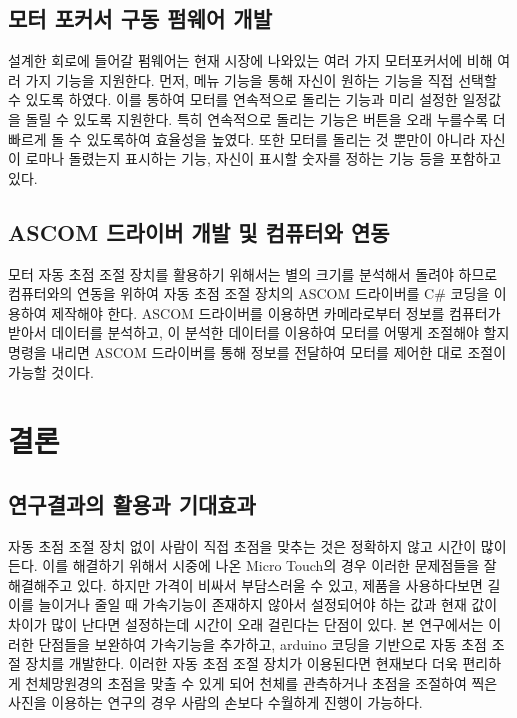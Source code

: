 \documentclass{abstract_hutech}
\begin{document}
\subsection{모터 포커서 구동 펌웨어 개발}

설계한 회로에 들어갈 펌웨어는 현재 시장에 나와있는 여러 가지 모터포커서에 비해 여러 가지 기능을 지원한다. 먼저, 메뉴 기능을 통해 자신이 원하는 기능을 직접 선택할 수 있도록 하였다. 이를 통하여 모터를 연속적으로 돌리는 기능과 미리 설정한 일정값을 돌릴 수 있도록 지원한다. 특히 연속적으로 돌리는 기능은 버튼을 오래 누를수록 더 빠르게 돌 수 있도록하여 효율성을 높였다. 또한 모터를 돌리는 것 뿐만이 아니라 자신이 로마나 돌렸는지 표시하는 기능, 자신이 표시할 숫자를 정하는 기능 등을 포함하고 있다.

\subsection{ASCOM 드라이버 개발 및 컴퓨터와 연동}

모터 자동 초점 조절 장치를 활용하기 위해서는 별의 크기를 분석해서 돌려야 하므로 컴퓨터와의 연동을 위하여 자동 초점 조절 장치의 ASCOM 드라이버를 C\# 코딩을 이용하여 제작해야 한다. ASCOM 드라이버를 이용하면 카메라로부터 정보를 컴퓨터가 받아서 데이터를 분석하고, 이 분석한 데이터를 이용하여 모터를 어떻게 조절해야 할지 명령을 내리면 ASCOM 드라이버를 통해 정보를 전달하여 모터를 제어한 대로 조절이 가능할 것이다.

\section{결론}

\subsection{연구결과의 활용과 기대효과}

자동 초점 조절 장치 없이 사람이 직접 초점을 맞추는 것은 정확하지 않고 시간이 많이 든다. 이를 해결하기 위해서 시중에 나온 Micro Touch의 경우 이러한 문제점들을 잘 해결해주고 있다. 하지만 가격이 비싸서 부담스러울 수 있고, 제품을 사용하다보면 길이를 늘이거나 줄일 때 가속기능이 존재하지 않아서 설정되어야 하는 값과 현재 값이 차이가 많이 난다면 설정하는데 시간이 오래 걸린다는 단점이 있다. 본 연구에서는 이러한 단점들을 보완하여 가속기능을 추가하고, arduino 코딩을 기반으로 자동 초점 조절 장치를 개발한다. 이러한 자동 초점 조절 장치가 이용된다면 현재보다 더욱 편리하게 천체망원경의 초점을 맞출 수 있게 되어 천체를 관측하거나 초점을 조절하여 찍은 사진을 이용하는 연구의 경우 사람의 손보다 수월하게 진행이 가능하다.
\end{document}
